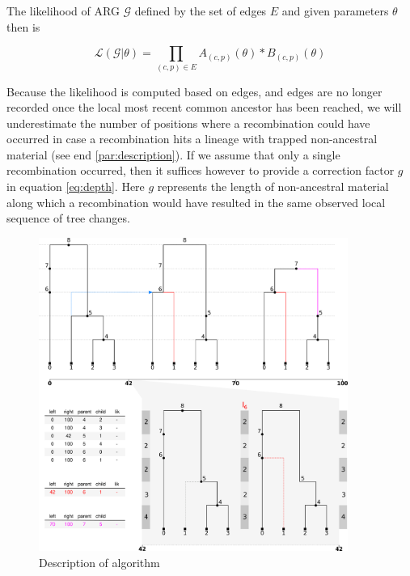 \documentclass{article}
\begin{document}
The likelihood of ARG $\mathcal{G}$ defined by the set of edges $E$ and
given parameters $\theta$ then is

\begin{equation}\label{eq:full-lik}
\mathcal{L}(\mathcal{G}|\theta) = \prod_{(c, p) \in E} A_{(c, p)}(\theta) * B_{(c, p)}(\theta)
\end{equation}


Because the likelihood is computed based on edges,
and edges are no longer recorded once the local most recent common ancestor 
has been reached, we will underestimate the number of positions where 
a recombination could have occurred in case a recombination hits a 
lineage with trapped non-ancestral material (see end \ref{par:description}). 
If we assume that only a single recombination 
occurred, then it suffices however to provide a correction factor $g$ in equation
\ref{eq:depth}. Here $g$ represents the 
length of non-ancestral material along which a recombination would have resulted  
in the same observed local sequence of tree changes.


\begin{figure}[h!] \label{fig:algo}
\centering
\includegraphics[width=0.9\textwidth]{figures/smc_algo.png}
\caption{Description of algorithm}
\end{figure}
\end{document}
